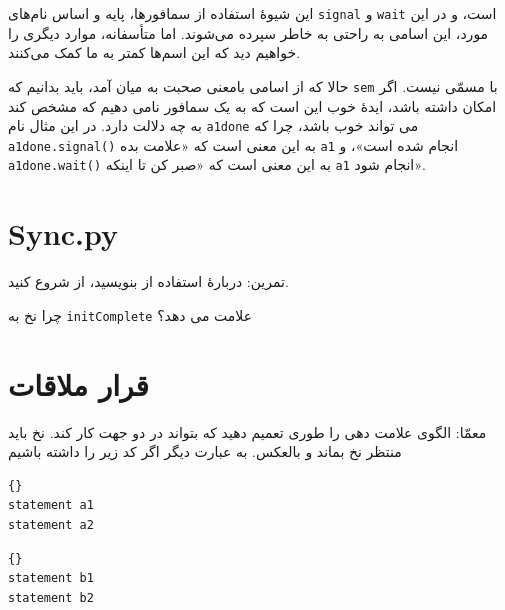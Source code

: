 \documentclass{book}
\begin{document}
این شیوهٔ استفاده از سمافورها، پایه و اساس نام‌های \texttt{signal} و \texttt{wait} است، 
و در این مورد، این اسامی به راحتی به خاطر سپرده می‌شوند. اما متأسفانه، موارد دیگری را خواهیم دید که این اسم‌ها کمتر به ما کمک می‌کنند.

حالا که از اسامی بامعنی صحبت به میان آمد، باید بدانیم که \texttt{sem} با مسمّی نیست.
اگر امکان داشته باشد، ایدهٔ خوب این است که به یک سمافور نامی دهیم که مشخص کند به چه دلالت دارد. 
در این مثال نام \texttt{a1done} می تواند خوب باشد، چرا که \texttt{ a1done.signal()} 
به این معنی است که «علامت بده \texttt{a1} انجام شده است»، و \texttt{a1done.wait()} 
به این معنی است که «صبر کن تا اینکه \texttt{a1} انجام شود».

\section{Sync.py}
\label{sync.py}
    تمرین: دربارهٔ استفاده از  بنویسید، از  شروع کنید.

چرا نخ  به \texttt{initComplete} علامت می دهد؟


\section{قرار ملاقات}
\label{rendezvous}

معمّا: الگوی علامت دهی را طوری تعمیم دهید که بتواند در دو جهت کار کند. 
نخ  باید منتظر نخ  بماند و بالعکس. به عبارت دیگر اگر کد زیر را داشته باشیم

\begin{latin}
\begin{minipage}[t]{2in}
\begin{latin}
\begin{lstlisting}[title=\rl{نخ \lr{A}}]{}
statement a1
statement a2
\end{lstlisting}
\end{latin}
\end{minipage}
\hfill
\begin{minipage}[t]{2in}
\begin{latin}
\begin{lstlisting}[title=\rl{نخ \lr{B}}]{}
statement b1
statement b2
\end{lstlisting}
\end{latin}
\end{minipage}
\end{latin}
\end{document}
